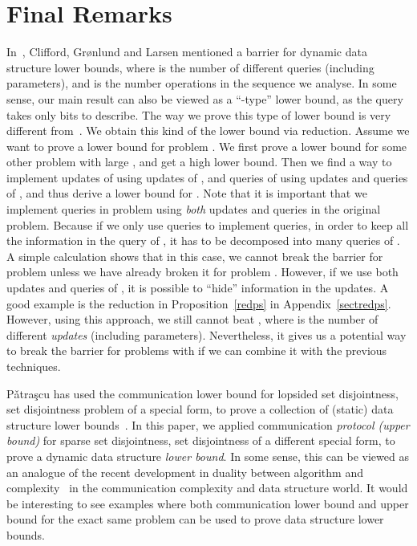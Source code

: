 \documentclass[11pt]{article}
\begin{document}
\section{Final Remarks}\label{sectremark}
In~\cite{CGL15}, Clifford, Gr\o{}nlund and Larsen mentioned a  barrier for dynamic data structure lower bounds, where  is the number of different queries (including parameters), and  is the number operations in the sequence we analyse. In some sense, our main result can also be viewed as a ``-type'' lower bound, as the query takes only  bits to describe. The way we prove this type of lower bound is very different from~\cite{Larsen12a, Larsen12b, CGL15}. We obtain this kind of the lower bound via reduction. Assume we want to prove a lower bound for problem . We first prove a lower bound for some other problem  with large , and get a high lower bound. Then we find a way to implement updates of  using updates of , and queries of  using updates and queries of , and thus derive a lower bound for . Note that it is important that we implement queries in problem  using \emph{both} updates and queries in the original problem. Because if we only use queries to implement queries, in order to keep all the information in the query of , it has to be decomposed into many queries of . A simple calculation shows that in this case, we cannot break the barrier for problem  unless we have already broken it for problem . However, if we use both updates and queries of , it is possible to ``hide'' information in the updates. A good example is the reduction in Proposition~\ref{redps} in Appendix~\ref{sectredps}. However, using this approach, we still cannot beat , where  is the number of different \emph{updates} (including parameters). Nevertheless, it gives us a potential way to break the  barrier for problems with  if we can combine it with the previous techniques. 

P\v{a}tra\c{s}cu has used the communication lower bound for lopsided set disjointness, set disjointness problem of a special form, to prove a collection of (static) data structure lower bounds~\cite{Pat08, Pat11}. In this paper, we applied communication \emph{protocol (upper bound)} for sparse set disjointness, set disjointness of a different special form, to prove a dynamic data structure \emph{lower bound}. In some sense, this can be viewed as an analogue of the recent development in duality between algorithm and complexity~\cite{Williams13, Williams14, AWY15} in the communication complexity and data structure world. It would be interesting to see examples where both communication lower bound and upper bound for the exact same problem can be used to prove data structure lower bounds.
\end{document}
